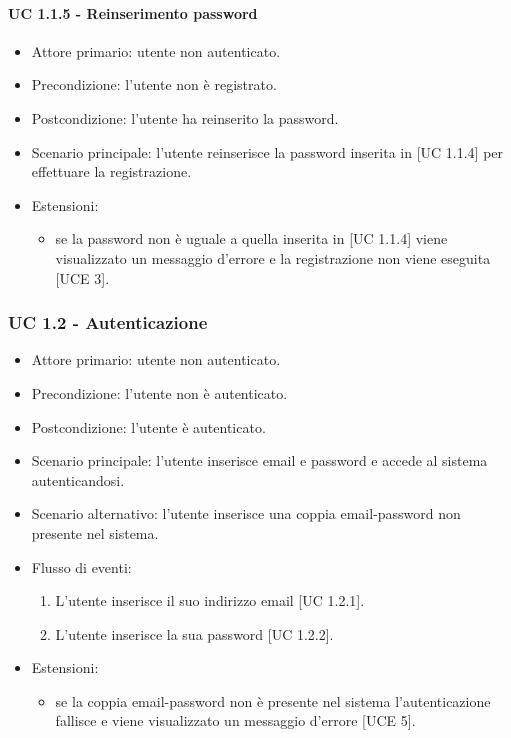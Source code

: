         \paragraph{UC 1.1.5 - Reinserimento password}
            \begin{itemize}
                \item Attore primario: utente non autenticato.
                \item Precondizione: l'utente non è registrato.
                \item Postcondizione: l'utente ha reinserito la password.
                \item Scenario principale: l'utente reinserisce la password inserita in [UC 1.1.4] per effettuare la registrazione.
                \item Estensioni:
                    \begin{itemize}
                        \item se la password non è uguale a quella inserita in [UC 1.1.4] viene visualizzato un messaggio d'errore e la registrazione non viene eseguita [UCE 3].
                    \end{itemize}
            \end{itemize}
    \subsubsection{UC 1.2 - Autenticazione}
        \begin{itemize}
            \item Attore primario: utente non autenticato.
            \item Precondizione: l'utente non è autenticato.
            \item Postcondizione: l'utente è autenticato.
            \item Scenario principale: l'utente inserisce email e password e accede al sistema autenticandosi.
            \item Scenario alternativo: l'utente inserisce una coppia email-password non presente nel sistema.
            \item Flusso di eventi:
                \begin{enumerate}
                    \item L'utente inserisce il suo indirizzo email [UC 1.2.1].
                    \item L'utente inserisce la sua password [UC 1.2.2].
                \end{enumerate}
            \item Estensioni:
                \begin{itemize}
                    \item se la coppia email-password non è presente nel sistema l'autenticazione fallisce e viene visualizzato un messaggio d'errore [UCE 5].
                \end{itemize}
        \end{itemize}
